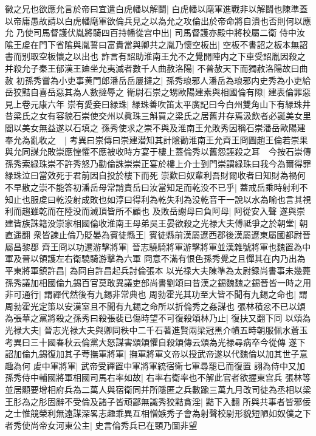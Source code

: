 徽之兄也欲應允言於帝曰宜遣白虎幡以解鬬|{
	白虎幡以麾軍進戰非以解鬬也陳準蓋以帝庸愚故請以白虎幡麾軍欲倫兵見之以為允之攻倫出於帝命將自潰也否則何以應允}
乃使司馬督護伏胤將騎四百持幡從宫中出|{
	司馬督護亦殿中將校屬二衛}
侍中汝隂王䖍在門下省隂與胤誓曰富貴當與卿共之胤乃懷空板出|{
	空板不書詔之板本無詔書而别取空板懷之以出也}
詐言有詔助淮南王允不之覺開陣内之下車受詔胤因殺之并殺允子秦王郁漢王廸坐允夷滅者數千人曲赦洛陽|{
	不普赦天下而獨赦洛陽故曰曲赦}
初孫秀嘗為小吏事黄門郎潘岳岳屢撻之|{
	孫秀琅邪人潘岳為琅邪内史秀為小吏給岳狡黠自喜岳惡其為人數撻辱之}
衛尉石崇之甥歐陽建素與相國倫有隙|{
	建表倫罪惡見上卷元康六年}
崇有愛妾曰緑珠|{
	緑珠善吹笛太平廣記曰今白州雙角山下有緑珠井昔梁氏之女有容貌石崇使交州以眞珠三斛買之梁氏之居舊井存焉汲飲者必誕美女里閭以美女無益遂以石填之}
孫秀使求之崇不與及淮南王允敗秀因稱石崇潘岳歐陽建奉允為亂收之　|{
	考異曰崇傳曰崇建潜知其計隂勸淮南王允齊王冏圖趙王倫若崇果與允同謀允敗崇應惶懼不應被收時方宴于樓上蓋倫秀以舊怨誣殺之耳　今按石崇傳孫秀索緑珠崇不許秀怒乃勸倫誅崇崇正宴於樓上介士到門崇謂緑珠曰我今為爾得罪緑珠泣曰當效死于君前因自投於樓下而死}
崇歎曰奴輩利吾財爾收者曰知財為禍何不早散之崇不能答初潘岳母常誚責岳曰汝當知足而乾没不已乎|{
	蓋戒岳乘時射利不知止也服䖍曰乾没射成敗也如淳曰得利為乾失利為没乾音干一說以水為喻也言其視利而趨雖乾而在陸没而滅頂皆所不顧也}
及敗岳謝母曰負阿母|{
	阿從安入聲}
遂與崇建皆族誅籍没崇家相國倫收淮南王母弟吳王晏欲殺之光禄大夫傅祗爭之於朝堂|{
	朝直遥翻}
衆皆諫止倫乃貶晏為賓徒縣王|{
	賓徒縣前漢屬遼西郡後漢屬遼東屬國都尉晉屬昌黎郡}
齊王冏以功遷游擊將軍|{
	晉志驍騎將軍游擊將軍並漢雜號將軍也魏置為中軍及晉以領護左右衛驍騎游擊為六軍}
冏意不滿有恨色孫秀覺之且憚其在内乃出為平東將軍鎮許昌|{
	為冏自許昌起兵討倫張本}
以光禄大夫陳準為太尉録尚書事未幾薨　孫秀議加相國倫九錫百官莫敢異議吏部尚書劉頌曰昔漢之錫魏魏之錫晉皆一時之用非可通行|{
	謂禪代然後有九錫非常典也}
周勃霍光其功至大皆不聞有九錫之命也|{
	謂周勃霍光定策以安漢室且不聞有九錫之命所以折倫秀之姦謀也}
張林積忿不已以頌為張華之黨將殺之孫秀曰殺張裴已傷時望不可復殺頌林乃止|{
	復扶又翻下同}
以頌為光禄大夫|{
	晉志光禄大夫與卿同秩中二千石著進賢兩梁冠黑介幘五時朝服佩水蒼玉　考異曰三十國春秋云倫黨大怒謀害頌頌懼自殺頌傳云頌為光禄尋病卒今從傳}
遂下詔加倫九錫復加其子荂撫軍將軍|{
	撫軍將軍文帝以授武帝遂以代魏倫以加其世子意趣為何}
䖍中軍將軍|{
	武帝受禪置中軍將軍統宿衛七軍尋罷已而復置}
詡為侍中又加孫秀侍中輔國將軍相國司馬右率如故|{
	右率右衛率也不解此官者欲握東宫兵}
張林等並居顯要增相府兵為二萬人與宿衛同并所隱匿之兵數踰三萬九月改司徒為丞相以梁王肜為之肜固辭不受倫及諸子皆頑鄙無識秀狡黠貪淫|{
	黠下入翻}
所與共事者皆邪佞之士惟競榮利無遠謀深畧志趣乖異互相憎嫉秀子會為射聲校尉形貌短陋如奴僕之下者秀使尚帝女河東公主|{
	史言倫秀兵已在頸乃圖非望}
